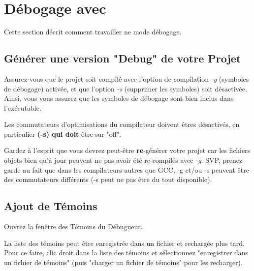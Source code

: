 \section{Débogage avec \codeblocks}\label{sec:debugwithcb}

Cette section décrit comment travailler ne mode débogage.

\subsection{Générer une version "Debug" de votre Projet}

Assurez-vous que le projet soit compilé avec l'option de compilation \textit{-g} (symboles de débogage) activée, et que l'option \textit{-s} (supprimer les symboles) soit désactivée. Ainsi, vous vous assurez que les symboles de débogage sont bien inclus dans l'exécutable.

Les commutateurs d'optimisations du compilateur doivent êtres désactivés, en particulier \textbf{(-s) qui doit} être sur "off".

Gardez à l'esprit que vous devrez peut-être \textbf{re}-générer votre projet car les fichiers objets bien qu'à jour peuvent ne pas avoir été re-compilés avec \textit{-g}. SVP, prenez garde au fait que dans les compilateurs autres que GCC, -g et/ou -s peuvent être des commutateurs différents (-s peut ne pas être du tout disponible).


\subsection{Ajout de Témoins}


Ouvrez la fenêtre des Témoins du Débugueur.

La liste des témoins peut être enregistrée dans un fichier et rechargée plus tard. Pour ce faire, clic droit dans la liste des témoins et sélectionnez "enregistrer dans un fichier de témoins" (puis "charger un fichier de témoins" pour les recharger). 


